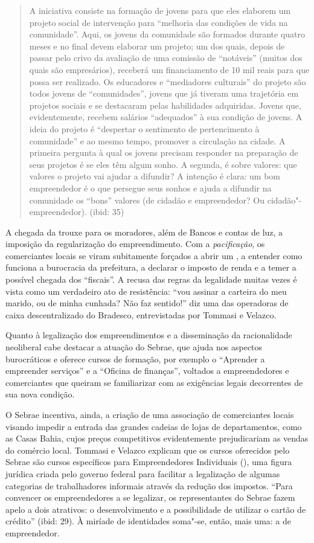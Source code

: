 \begin{quote}
A iniciativa consiste na formação de jovens para que eles elaborem um
projeto social de intervenção para ``melhoria das condições de vida na
comunidade''. Aqui, os jovens da comunidade são formados durante quatro
meses e no final devem elaborar um projeto; um dos quais, depois de
passar pelo crivo da avaliação de uma comissão de ``notáveis'' (muitos
dos quais são empresários), receberá um financiamento de 10 mil reais
para que possa ser realizado. Os educadores e ``mediadores culturais''
do projeto são todos jovens de ``comunidades'', jovens que já tiveram
uma trajetória em projetos sociais e se destacaram pelas habilidades
adquiridas. Jovens que, evidentemente, recebem salários ``adequados'' à
sua condição de jovens. A ideia do projeto é ``despertar o sentimento de
pertencimento à comunidade'' e ao mesmo tempo, promover a circulação na
cidade. A primeira pergunta à qual os jovens precisam responder na
preparação de seus projetos é se eles têm algum sonho. A segunda, é
sobre valores: que valores o projeto vai ajudar a difundir? A intenção é
clara: um bom empreendedor é o que persegue seus sonhos e ajuda a
difundir na comunidade os ``bons'' valores (de cidadão e empreendedor?
Ou cidadão"-empreendedor). (ibid: 35)
\end{quote}

A chegada da  trouxe para os moradores, além de Bancos e contas de
luz, a imposição da regularização do empreendimento. Com a
\emph{pacificação}, os comerciantes locais se viram subitamente forçados
a abrir um , a entender como funciona a burocracia da prefeitura, a
declarar o imposto de renda e a temer a possível chegada dos
``fiscais''. A recusa das regras da legalidade muitas vezes é vista como
um verdadeiro ato de resistência: ``vou assinar a carteira do meu
marido, ou de minha cunhada? Não faz sentido!'' diz uma das operadoras
de caixa descentralizado do Bradesco, entrevistadas por Tommasi e
Velazco.

Quanto à legalização dos empreendimentos e a disseminação da
racionalidade neoliberal cabe destacar a atuação do Sebrae, que ajuda
nos aspectos burocráticos e oferece cursos de formação, por exemplo o
``Aprender a empreender serviços'' e a ``Oficina de finanças'', voltados
a empreendedores e comerciantes que queiram se familiarizar com as
exigências legais decorrentes de sua nova condição.

O Sebrae incentiva, ainda, a criação de uma associação de comerciantes
locais visando impedir a entrada das grandes cadeias de lojas de
departamentos, como as Casas Bahia, cujos preços competitivos
evidentemente prejudicariam as vendas do comércio local. Tommasi e
Velazco explicam que os cursos oferecidos pelo Sebrae são cursos
específicos para Empreendedores Individuais (), uma figura jurídica
criada pelo governo federal para facilitar a legalização de algumas
categorias de trabalhadores informais através da redução dos impostos.
``Para convencer os empreendedores a se legalizar, os representantes do
Sebrae fazem apelo a dois atrativos: o desenvolvimento e a possibilidade
de utilizar o cartão de crédito'' (ibid: 29). À miríade de identidades
soma"-se, então, mais uma: a de empreendedor.

